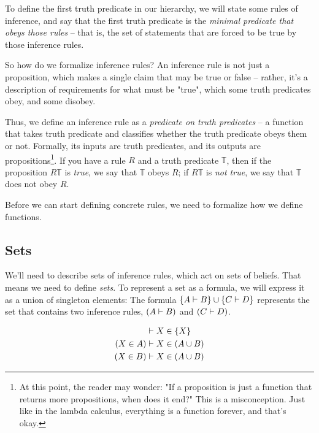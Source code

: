 \documentclass{article}
\begin{document}
  To define the first truth predicate in our hierarchy, we will state some rules of inference, and say that the first truth predicate is the \emph{minimal predicate that obeys those rules} – that is, the set of statements that are forced to be true by those inference rules.
  
  So how do we formalize inference rules? An inference rule is not just a proposition, which makes a single claim that may be true or false – rather, it's a description of requirements for what must be "true", which some truth predicates obey, and some disobey.
    
  Thus, we define an inference rule as a \emph{predicate on truth predicates} – a function that takes truth predicate and classifies whether the truth predicate obeys them or not. Formally, its inputs are truth predicates, and its outputs are propositions\footnote{At this point, the reader may wonder: "If a proposition is just a function that returns more propositions, when does it end?" This is a misconception. Just like in the lambda calculus, everything is a function forever, and that's okay.}. If you have a rule $R$ and a truth predicate $\mathbb{T}$, then if the proposition $R \mathbb{T}$ is \emph{true}, we say that $\mathbb{T}$ obeys $R$; if $R \mathbb{T}$ is \emph{not true}, we say that $\mathbb{T}$ does not obey $R$.
  
  Before we can start defining concrete rules, we need to formalize how we define functions.
  
  \fi
  
  \subsection{Sets}
  
  We'll need to describe sets of inference rules, which act on sets of beliefs. That means we need to define \emph{sets}. To represent a set as a formula, we will express it as a union of singleton elements: The formula $\{A \vdash B\} \cup \{C \vdash D\}$ represents the set that contains two inference rules, $(A \vdash B)$ and $(C \vdash D)$.
    
  \begin{align*}
    &\vdash X \in \{X\}\\
    (X \in A) &\vdash X \in (A \cup B)\\
    (X \in B) &\vdash X \in (A \cup B)\\
  \end{align*}
  
\end{document}
